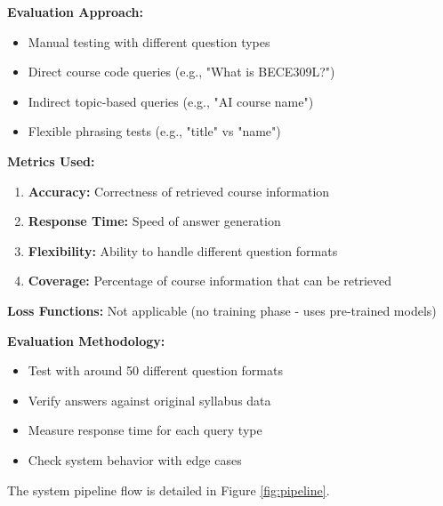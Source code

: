 \documentclass[conference]{IEEEtran}
\begin{document}
\textbf{Evaluation Approach:}
\begin{itemize}
    \item Manual testing with different question types
    \item Direct course code queries (e.g., "What is BECE309L?")
    \item Indirect topic-based queries (e.g., "AI course name")
    \item Flexible phrasing tests (e.g., "title" vs "name")
\end{itemize}

\textbf{Metrics Used:}
\begin{enumerate}
    \item \textbf{Accuracy:} Correctness of retrieved course information
    \item \textbf{Response Time:} Speed of answer generation
    \item \textbf{Flexibility:} Ability to handle different question formats
    \item \textbf{Coverage:} Percentage of course information that can be retrieved
\end{enumerate}

\textbf{Loss Functions:} Not applicable (no training phase - uses pre-trained models)

\textbf{Evaluation Methodology:}
\begin{itemize}
    \item Test with around 50 different question formats
    \item Verify answers against original syllabus data
    \item Measure response time for each query type
    \item Check system behavior with edge cases
\end{itemize}

The system pipeline flow is detailed in Figure \ref{fig:pipeline}.
\end{document}

